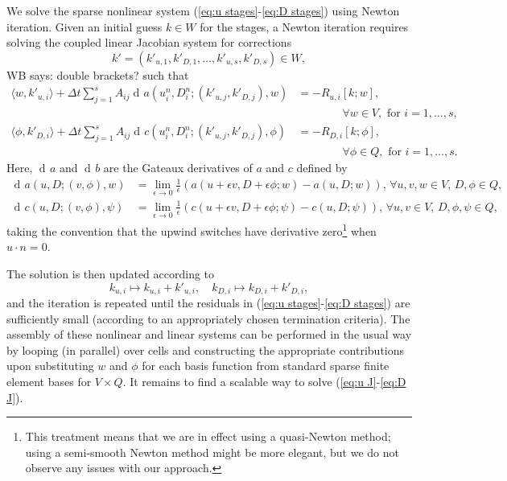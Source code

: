 \documentclass[a4paper, 12pt]{article}
\newcommand{\werner}[1]{{\color{magenta}WB says: #1}}
\DeclareMathOperator{\diff}{d}
\DeclareMathOperator{\gat}{\diff\!}
\begin{document}
We solve the sparse nonlinear system (\ref{eq:u stages}-\ref{eq:D
  stages}) using Newton iteration. Given an initial guess $k\in W$ for
the stages, a Newton iteration requires solving the coupled linear
Jacobian system for corrections
\[
k' = (k'_{u,1},k'_{D,1},\ldots, k'_{u,s},k'_{D,s}) \in W,
\]
\werner{double brackets?}
such that
\begin{align}
  \nonumber
    \langle w, k'_{u,i} \rangle +
   \Delta t \sum_{j=1}^sA_{ij}\gat a\left(u^n_i,D^n_i;(k'_{u,j}, k'_{D,j}),
   w\right) &=  -R_{u,i}[k;w], \\
   \label{eq:u J}
   & \qquad\qquad    \forall w \in V,\mbox{ for }i=1,\ldots,s, \\
   \nonumber
  \langle \phi, k'_{D,i} \rangle
  + \Delta t\sum_{j=1}^sA_{ij}\gat c\left(u^n_i,D^n_i;(k'_{u,j}, k'_{D,j}),
  \phi\right)  &= -R_{D,i}[k;\phi], \\
  & \qquad \qquad \forall \phi \in Q,\mbox{ for }i=1,\ldots,s.
    \label{eq:D J}
\end{align}
Here, $\gat a$ and $\gat b$ are the Gateaux
derivatives of $a$ and $c$ defined by
\begin{align}
  \gat a(u,D;(v,\phi),w) & = \lim_{\epsilon\to 0}
  \frac{1}{\epsilon}(a(u+\epsilon v,D+\epsilon \phi; w)
  - a(u,D;w)),  \, \forall u,v,w \in V, \, D,\phi \in Q, \\
  \gat c(u,D;(v,\phi),\psi) & = \lim_{\epsilon\to 0}
  \frac{1}{\epsilon}(c(u+\epsilon v,D+\epsilon \phi; \psi)
  - c(u,D;\psi)), \, \forall u,v \in V,\, D,\phi,\psi \in Q,
\end{align}
taking the convention that the upwind switches have derivative
zero\footnote{This treatment means that we are in effect using a
quasi-Newton method; using a semi-smooth Newton method might be
more elegant, but we do not observe any issues with our approach.}
when $u\cdot n=0$.

The solution is then updated according to
\begin{equation}
  k_{u,i}\mapsto k_{u,i} + k'_{u,i}, \quad
  k_{D,i}\mapsto k_{D,i} + k'_{D,i},
\end{equation}
and the iteration is repeated until the residuals in (\ref{eq:u
  stages}-\ref{eq:D stages}) are sufficiently small (according to an
appropriately chosen termination criteria).  The assembly of these
nonlinear and linear systems can be performed in the usual way by
looping (in parallel) over cells and constructing the appropriate
contributions upon substituting $w$ and $\phi$ for each basis function
from standard sparse finite element bases for $V\times Q$. It remains
to find a scalable way to solve (\ref{eq:u J}-\ref{eq:D J}).
\end{document}
